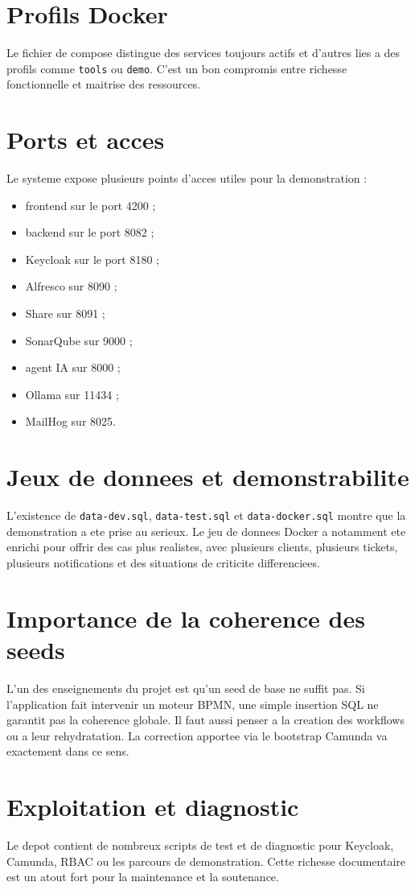 \section{Profils Docker}

Le fichier de compose distingue des services toujours actifs et d'autres lies a des profils comme \texttt{tools} ou \texttt{demo}. C'est un bon compromis entre richesse fonctionnelle et maitrise des ressources.

\section{Ports et acces}

Le systeme expose plusieurs points d'acces utiles pour la demonstration :

\begin{itemize}[leftmargin=1.2cm]
  \item frontend sur le port 4200 ;
  \item backend sur le port 8082 ;
  \item Keycloak sur le port 8180 ;
  \item Alfresco sur 8090 ;
  \item Share sur 8091 ;
  \item SonarQube sur 9000 ;
  \item agent IA sur 8000 ;
  \item Ollama sur 11434 ;
  \item MailHog sur 8025.
\end{itemize}

\section{Jeux de donnees et demonstrabilite}

L'existence de \texttt{data-dev.sql}, \texttt{data-test.sql} et \texttt{data-docker.sql} montre que la demonstration a ete prise au serieux. Le jeu de donnees Docker a notamment ete enrichi pour offrir des cas plus realistes, avec plusieurs clients, plusieurs tickets, plusieurs notifications et des situations de criticite differenciees.

\section{Importance de la coherence des seeds}

L'un des enseignements du projet est qu'un seed de base ne suffit pas. Si l'application fait intervenir un moteur BPMN, une simple insertion SQL ne garantit pas la coherence globale. Il faut aussi penser a la creation des workflows ou a leur rehydratation. La correction apportee via le bootstrap Camunda va exactement dans ce sens.

\section{Exploitation et diagnostic}

Le depot contient de nombreux scripts de test et de diagnostic pour Keycloak, Camunda, RBAC ou les parcours de demonstration. Cette richesse documentaire est un atout fort pour la maintenance et la soutenance.


